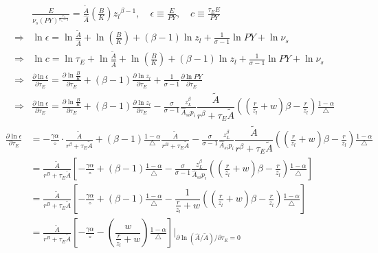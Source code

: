 \documentclass[12pt]{article} %
\begin{document}
\begin{enumerate}
    \begin{align*}
        & \frac{E}{\nu_{s}(PY)^{\frac{\sigma_s}{\sigma_s - 1}}}  = \frac{\tilde{A}}{\hat{A}}(\frac{B}{K}) {{z_l}}^{\beta-1} , \quad \epsilon \equiv  \frac{E}{PY}, \quad c \equiv \frac{\tau_E E}{PY}\\
        \Rightarrow & \ln \epsilon =  \ln \frac{\tilde{A}}{\hat{A}} + \ln(\frac{B}{K}) + (\beta-1) \ln {{z_l}} + \frac{1}{\sigma -1} \ln PY + \ln \nu_{s} \\
        \Rightarrow & \ln c = \ln \tau_E + \ln \frac{\tilde{A}}{\hat{A}} + \ln(\frac{B}{K}) + (\beta-1) \ln {{z_l}} + \frac{1}{\sigma -1} \ln PY + \ln \nu_{s}
        \\
        \Rightarrow & \frac{\partial \ln \epsilon}{\partial \tau_E} =   \frac{\partial \ln \frac{B}{K} }{\partial \tau_E} 
        + (\beta - 1) \frac{\partial \ln z_l }{\partial \tau_E} + \frac{1}{\sigma -1} \frac{\partial\ln PY }{\partial \tau_E}\\
        \Rightarrow & \frac{\partial \ln \epsilon}{\partial \tau_E} =   \frac{\partial \ln \frac{B}{K} }{\partial \tau_E}
        + (\beta - 1) \frac{\partial \ln z_l }{\partial \tau_E}  - \frac{\sigma}{\sigma -1}\frac{z_L^{\beta}}{\hat{A}_{si}p_i} \dfrac{\tilde{A}}{r^\beta+\tau_E \tilde{A}}
        ((\frac{r}{z_l} + w)\beta-\frac{r}{z_l} )\frac{1-\alpha}{\triangle}
    \end{align*}
    \begin{align*}
        \frac{\partial \ln \epsilon}{\partial \tau_E}  &=   - \frac{\gamma\alpha}{\circ} \cdot \frac{\tilde{A}}{r^\beta+\tau_E \tilde{A}}	
        + (\beta-1) \frac{1-\alpha}{\triangle}\frac{\tilde{A}}{r^B + \tau_E\tilde{A}}
        - \frac{\sigma}{\sigma -1}\frac{z_L^{\beta}}{\hat{A}_{si}p_i} \dfrac{\tilde{A}}{r^\beta+\tau_E \tilde{A}}
        ((\frac{r}{z_l} + w)\beta-\frac{r}{z_l} )\frac{1-\alpha}{\triangle}\\
        &= \frac{\tilde{A}}{r^B + \tau_E\tilde{A}}\left[
            -\frac{\gamma\alpha}{\circ} 
            + (\beta-1) \frac{1-\alpha}{\triangle} 
            - \frac{\sigma}{\sigma -1}\frac{z_L^{\beta}}{{\hat{A}_{si}}p_i} {((\frac{r}{z_l} + w)\beta-\frac{r}{z_l} )}\frac{1-\alpha}{\triangle}
        \right]\\
        &= \frac{\tilde{A}}{r^B + \tau_E\tilde{A}}\left[
            -\frac{\gamma\alpha}{\circ} 
            + (\beta-1) \frac{1-\alpha}{\triangle} 
            - \dfrac{1}{\frac{r}{z_l} + w} {((\frac{r}{z_l} + w)\beta-\frac{r}{z_l} )}\frac{1-\alpha}{\triangle}
        \right]\\
        & = \frac{\tilde{A}}{r^B + \tau_E\tilde{A}}\left[
            -\frac{\gamma\alpha}{\circ} 
            - (\dfrac{w}{\frac{r}{z_l} + w})\frac{1-\alpha}{\triangle}
        \right]\left.\Bigg|_{\partial  \ln(\hat{A}/\tilde{A}) / \partial \tau_E = 0}\right.
    \end{align*}


\end{enumerate}
\end{document}
